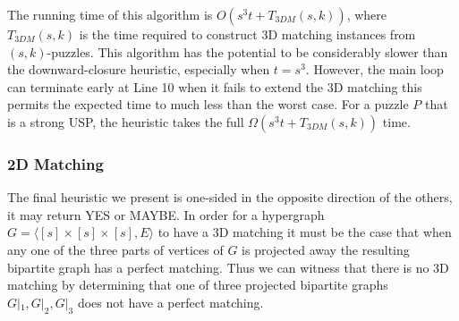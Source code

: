 \documentclass[11pt]{article}
\begin{document}
The running time of this algorithm is $O(s^3 t + T_{3DM}(s,k))$, where
$T_{3DM}(s,k)$ is the time required to construct 3D matching
instances from $(s,k)$-puzzles.  This algorithm has the potential to
be considerably slower than the downward-closure heuristic, especially
when $t = s^3$.  However, the main loop can terminate early at Line 10
when it fails to extend the 3D matching this permits the expected time
to much less than the worst case.  For a puzzle $P$ that is a strong
USP, the heuristic takes the full $\Omega(s^3 t + T_{3DM}(s,k))$ time.  


\begin{comment}
\subsubsection{Random}

XXX - There's also a random reordering heuristic, but I don't remember
the justification for it.  It's more elaborate than the other, but
less motivated.
 
\subsubsection{Graph Automorphism}

A strong uniquely-solvable puzzle must also be a uniquely-solvable
puzzle.  Given a puzzle $P$ we can construct a graph $G_P$ such that
$G_P$ is rigid iff $P$ is a uniquely-solvable puzzle.

XXX - I don't think this idea worked out.  The code correctly
implemented the approach, but the approach was flawed.  Probably
remove this section or add to future work.

\end{comment}

\subsubsection{2D Matching}

The final heuristic we present is one-sided in the opposite direction
of the others, it may return YES or MAYBE.  In order for a hypergraph
$G = \langle [s] \times [s] \times [s], E\rangle$ to have a 3D
matching it must be the case that when any one of the three parts of
vertices of $G$ is projected away the resulting bipartite graph has a
perfect matching.  Thus we can witness that there is no 3D matching by
determining that one of three projected bipartite graphs $G|_1, G|_2,
G|_3$ does not have a perfect matching. 
\end{document}
